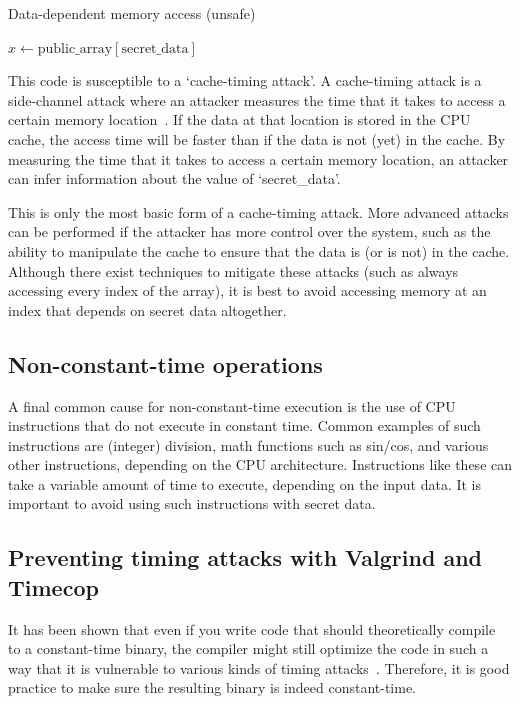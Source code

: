 \documentclass[11pt,a4paper]{report}
\theoremstyle{definition}
\begin{document}
\begin{algorithm}
  \caption{Data-dependent memory access (unsafe)}
  \label{alg:datadependentmemoryaccess}
  \begin{algorithmic}[1]
    \State $x \gets \text{public\_array}[\text{secret\_data}]$
  \end{algorithmic}
\end{algorithm}

This code is susceptible to a `cache-timing attack'. A cache-timing attack is a side-channel attack where an attacker measures the time that it takes to access a certain memory location~\cite{bernstein2005cache, kocher1996timing}. If the data at that location is stored in the CPU cache, the access time will be faster than if the data is not (yet) in the cache. By measuring the time that it takes to access a certain memory location, an attacker can infer information about the value of `secret\_data'.

This is only the most basic form of a cache-timing attack. More advanced attacks can be performed if the attacker has more control over the system, such as the ability to manipulate the cache to ensure that the data is (or is not) in the cache. Although there exist techniques to mitigate these attacks (such as always accessing every index of the array), it is best to avoid accessing memory at an index that depends on secret data altogether.

\subsection{Non-constant-time operations}
\label{sec:nonconstanttimeoperations}
A final common cause for non-constant-time execution is the use of CPU instructions that do not execute in constant time. Common examples of such instructions are (integer) division, math functions such as sin/cos, and various other instructions, depending on the CPU architecture. Instructions like these can take a variable amount of time to execute, depending on the input data. It is important to avoid using such instructions with secret data.

\subsection{Preventing timing attacks with Valgrind and Timecop}
\label{sec:valgrindtimecop}
It has been shown that even if you write code that should theoretically compile to a constant-time binary, the compiler might still optimize the code in such a way that it is vulnerable to various kinds of timing attacks~\cite{barthe2019formal, simon2018you}. Therefore, it is good practice to make sure the resulting binary is indeed constant-time.
\end{document}
